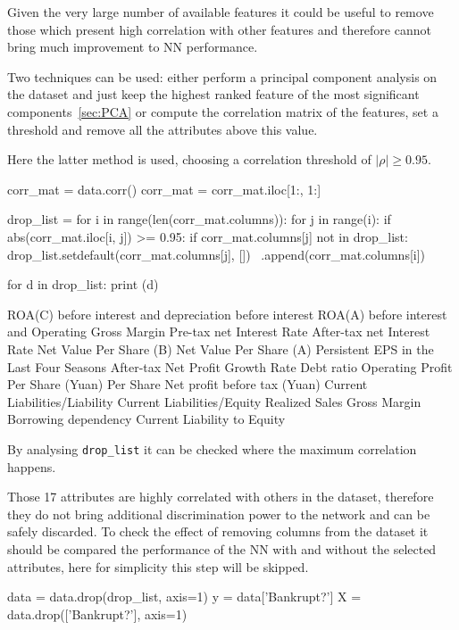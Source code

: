 Given the very large number of available features it could be useful to remove those which present high correlation with other features and therefore cannot bring much improvement to NN performance.

Two techniques can be used: either perform a principal component analysis on the dataset and just keep the highest ranked feature of the most significant components~\ref{sec:PCA} or compute the correlation matrix of the features, set a threshold and remove all the attributes above this value.

Here the latter method is used, choosing a correlation threshold of $|\rho|\geq 0.95$.

\begin{ipython}
corr_mat = data.corr()
corr_mat = corr_mat.iloc[1:, 1:]
	
drop_list = {}
for i in range(len(corr_mat.columns)):
    for j in range(i):
        if abs(corr_mat.iloc[i, j]) >= 0.95:
            if corr_mat.columns[j] not in drop_list:
                drop_list.setdefault(corr_mat.columns[j], []) \
                    .append(corr_mat.columns[i])

for d in drop_list:
    print (d)
\end{ipython}
\begin{ioutput}
ROA(C) before interest and depreciation before interest
ROA(A) before interest and %
Operating Gross Margin
Pre-tax net Interest Rate
After-tax net Interest Rate
Net Value Per Share (B)
Net Value Per Share (A)
Persistent EPS in the Last Four Seasons
After-tax Net Profit Growth Rate
Debt ratio %
Operating Profit Per Share (Yuan)
Per Share Net profit before tax (Yuan)
Current Liabilities/Liability
Current Liabilities/Equity
Realized Sales Gross Margin
Borrowing dependency
Current Liability to Equity
\end{ioutput}
\noindent 
By analysing \texttt{drop\_list} it can be checked where the maximum correlation happens.

Those 17 attributes are highly correlated with others in the dataset, therefore they do not bring additional discrimination power to the network and can be safely discarded. To check the effect of removing columns from the dataset it should be compared the performance of the NN with and without the selected attributes, here for simplicity this step will be skipped.

\begin{ipython}
data = data.drop(drop_list, axis=1)
y = data['Bankrupt?']
X = data.drop(['Bankrupt?'], axis=1)
\end{ipython}

